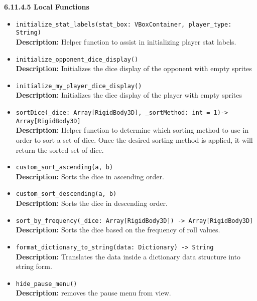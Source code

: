 \documentclass[12pt, titlepage]{article}
\begin{document}
\textbf{6.11.4.5 Local Functions}
\begin{itemize}
    \item \texttt{initialize\_stat\_labels(stat\_box: VBoxContainer, player\_type: String) }\\
	\textbf{Description:}  Helper function to assist in initializing player stat labels.
	
	\item \texttt{initialize\_opponent\_dice\_display() }\\
	\textbf{Description:} Initializes the dice display of the opponent with empty sprites
	
	\item \texttt{initialize\_my\_player\_dice\_display() }\\
	\textbf{Description:} Initializes the dice display of the player with empty sprites
	
	\item \texttt{sortDice(\_dice: Array[RigidBody3D], \_sortMethod: int = 1)-> Array[RigidBody3D] }\\
	\textbf{Description:} Helper function to determine which sorting method to use in order to sort a set of dice. Once the desired sorting method is applied, it will return the sorted set of dice.
	
	\item \texttt{custom\_sort\_ascending(a, b) }\\
	\textbf{Description:} Sorts the dice in ascending order.
	
	\item \texttt{custom\_sort\_descending(a, b) }\\
	\textbf{Description:} Sorts the dice in descending order.
	
	\item \texttt{sort\_by\_frequency(\_dice: Array[RigidBody3D]) -> Array[RigidBody3D] }\\
	\textbf{Description:} Sorts the dice based on the frequency of roll values.
	
	\item \texttt{format\_dictionary\_to\_string(data: Dictionary) -> String }\\
	\textbf{Description:} Translates the data inside a dictionary data structure into string form. 
	
	\item \texttt{hide\_pause\_menu()}\\
	\textbf{Description:} removes the pause menu from view.
	

\end{itemize}
\end{document}
